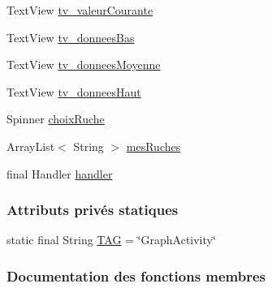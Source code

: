 \begin{DoxyCompactItemize}
\item 
Text\+View \hyperlink{classfr_1_1campus_1_1laurainc_1_1honeybee_1_1_graph_activity_a32402fa5819cf8f4322c3ae033a3c001}{tv\+\_\+valeur\+Courante}
\item 
Text\+View \hyperlink{classfr_1_1campus_1_1laurainc_1_1honeybee_1_1_graph_activity_a45953a1c53190ccbf5278e9725a2ce43}{tv\+\_\+donnees\+Bas}
\item 
Text\+View \hyperlink{classfr_1_1campus_1_1laurainc_1_1honeybee_1_1_graph_activity_a13bbba64ced68ea5c90d2761aaa70ac7}{tv\+\_\+donnees\+Moyenne}
\item 
Text\+View \hyperlink{classfr_1_1campus_1_1laurainc_1_1honeybee_1_1_graph_activity_afd8484aa261322b9c4df52fcfc69b1ac}{tv\+\_\+donnees\+Haut}
\item 
Spinner \hyperlink{classfr_1_1campus_1_1laurainc_1_1honeybee_1_1_graph_activity_ad937ed762b691b70747bb9f0b4d44994}{choix\+Ruche}
\item 
Array\+List$<$ String $>$ \hyperlink{classfr_1_1campus_1_1laurainc_1_1honeybee_1_1_graph_activity_ac3cf2f6b767bd189dc5c85ecbb48d0f6}{mes\+Ruches}
\item 
final Handler \hyperlink{classfr_1_1campus_1_1laurainc_1_1honeybee_1_1_graph_activity_ac42217c5db8be9ce814ab813e2d3080c}{handler}
\end{DoxyCompactItemize}
\subsubsection*{Attributs privés statiques}
\begin{DoxyCompactItemize}
\item 
static final String \hyperlink{classfr_1_1campus_1_1laurainc_1_1honeybee_1_1_graph_activity_a23295afaba61fcec14a254a6359deea4}{T\+AG} = \char`\"{}Graph\+Activity\char`\"{}
\end{DoxyCompactItemize}


\subsubsection{Documentation des fonctions membres}
\mbox{\label{classfr_1_1campus_1_1laurainc_1_1honeybee_1_1_graph_activity_a9e7c089cbecac26d4251fa5310038107}} 
